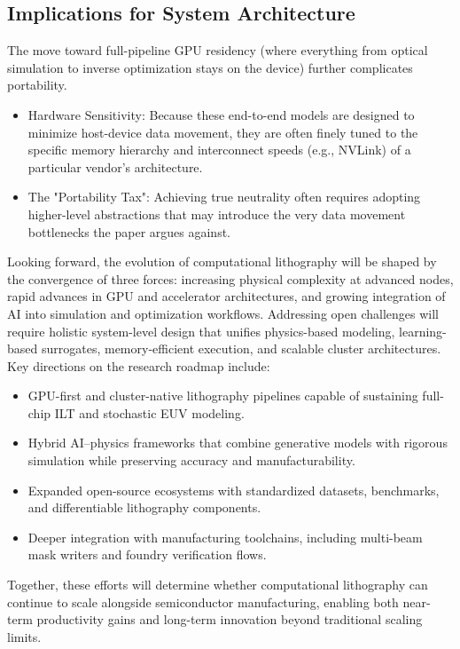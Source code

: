 \documentclass[pdflatex,sn-mathphys-num]{sn-jnl}%
\theoremstyle{thmstyleone}%
\theoremstyle{thmstyletwo}%
\theoremstyle{thmstylethree}%
\begin{document}
\subsection{Implications for System Architecture}
The move toward full-pipeline GPU residency (where everything from optical simulation to inverse optimization stays on the device) further complicates portability.
\begin{itemize}
  \item Hardware Sensitivity: Because these end-to-end models are designed to minimize host-device data movement, they are often finely tuned to the specific memory hierarchy and interconnect speeds (e.g., NVLink) of a particular vendor's architecture.
  \item The "Portability Tax": Achieving true neutrality often requires adopting higher-level abstractions that may introduce the very data movement bottlenecks the paper argues against.
  
\end{itemize}

Looking forward, the evolution of computational lithography will be shaped by the convergence of three forces: increasing physical complexity at advanced nodes, rapid advances in GPU and accelerator architectures, and growing integration of AI into simulation and optimization workflows. Addressing open challenges will require holistic system-level design that unifies physics-based modeling, learning-based surrogates, memory-efficient execution, and scalable cluster architectures. Key directions on the research roadmap include:
\begin{itemize}
	\item GPU-first and cluster-native lithography pipelines capable of sustaining full-chip ILT and stochastic EUV modeling.

 \item Hybrid AI–physics frameworks that combine generative models with rigorous simulation while preserving accuracy and manufacturability.

\item Expanded open-source ecosystems with standardized datasets, benchmarks, and differentiable lithography components.

\item Deeper integration with manufacturing toolchains, including multi-beam mask writers and foundry verification flows.

\end{itemize}
Together, these efforts will determine whether computational lithography can continue to scale alongside semiconductor manufacturing, enabling both near-term productivity gains and long-term innovation beyond traditional scaling limits.
  
\end{document}
